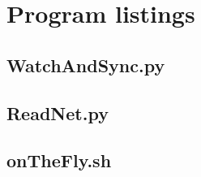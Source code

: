 \documentclass[12pt]{article}
\begin{document}

\newpage

\appendix

\newpage
\section{Program listings}
\subsection{WatchAndSync.py}
\label{sec:WatchAndSync}


\subsection{ReadNet.py}
\label{sec:ReadNet}


\subsection{onTheFly.sh}
\label{sec:onTheFly}

\end{document}
